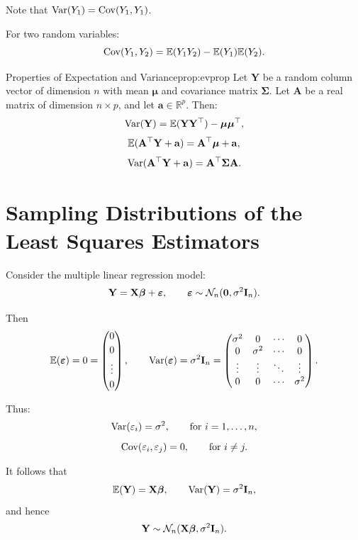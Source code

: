 Note that $\operatorname{Var}(Y_1) = \operatorname{Cov}(Y_1,Y_1)$.

For two random variables:
\[
\operatorname{Cov}(Y_1,Y_2) = \mathbb{E}(Y_1Y_2) - \mathbb{E}(Y_1)\mathbb{E}(Y_2).
\]

\begin{prop}{Properties of Expectation and Variance}{prop:evprop}
Let $\mathbf{Y}$ be a random column vector of dimension $n$ with mean $\boldsymbol{\mu}$ and covariance matrix $\boldsymbol{\Sigma}$. Let $\mathbf{A}$ be a real matrix of dimension $n \times p$, and let $\mathbf{a} \in \mathbb{R}^p$. Then:
\[
\operatorname{Var}(\mathbf{Y}) = \mathbb{E}(\mathbf{Y}\mathbf{Y}^{\top}) - \boldsymbol{\mu}\boldsymbol{\mu}^{\top},
\]
\[
\mathbb{E}(\mathbf{A}^{\top}\mathbf{Y} + \mathbf{a}) = \mathbf{A}^{\top}\boldsymbol{\mu} + \mathbf{a},
\]
\[
\operatorname{Var}(\mathbf{A}^{\top}\mathbf{Y} + \mathbf{a}) = \mathbf{A}^{\top}\boldsymbol{\Sigma}\mathbf{A}.
\]
\end{prop}

\clearpage

\section*{Sampling Distributions of the Least Squares Estimators}

Consider the multiple linear regression model:
\[
\mathbf{Y} = \mathbf{X}\boldsymbol{\beta} + \boldsymbol{\varepsilon},
\qquad
\boldsymbol{\varepsilon} \sim \mathcal{N}_n(\mathbf{0}, \sigma^2 \mathbf{I}_n).
\]

Then
\[
\mathbb{E}(\boldsymbol{\varepsilon})
= 0 =
\begin{pmatrix}
0 \\[0.2em]
0 \\[0.2em]
\vdots \\[0.2em]
0
\end{pmatrix},
\qquad
\operatorname{Var}(\boldsymbol{\varepsilon})
= \sigma^2 \mathbf{I}_n =
\begin{pmatrix}
\sigma^2 & 0 & \cdots & 0 \\
0 & \sigma^2 & \cdots & 0 \\
\vdots & \vdots & \ddots & \vdots \\
0 & 0 & \cdots & \sigma^2
\end{pmatrix}.
\]

Thus:
\[
\operatorname{Var}(\varepsilon_i) = \sigma^2,
\qquad \text{for } i = 1, \dots, n,
\]
\[
\operatorname{Cov}(\varepsilon_i, \varepsilon_j) = 0,
\qquad \text{for } i \neq j.
\]

It follows that
\[
\mathbb{E}(\mathbf{Y}) = \mathbf{X}\boldsymbol{\beta},
\qquad
\operatorname{Var}(\mathbf{Y}) = \sigma^2 \mathbf{I}_n,
\]
and hence
\[
\mathbf{Y} \sim \mathcal{N}_n(\mathbf{X}\boldsymbol{\beta}, \sigma^2 \mathbf{I}_n).
\]

